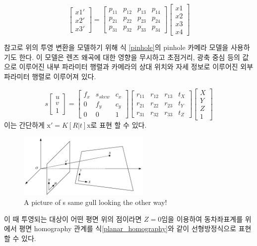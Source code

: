 \documentclass[master,korean,final]{cbnu-ecs}
\begin{document}
\begin{equation}
\begin{bmatrix} x1'\\x2'\\x3' \end{bmatrix} = \begin{bmatrix} p_{11} & p_{12} & p_{13} & p_{14} \\ p_{21} & p_{22} & p_{23} & p_{24}\\ p_{31} & p_{32} & p_{33} & p_{34} \end{bmatrix}\begin{bmatrix} x1\\x2\\x3\\x4 \end{bmatrix} \label{homography}
\end{equation}

참고로 위의 투영 변환을 모델하기 위해 식 \eqref{pinhole}의 pinhole 카메라 모델을 사용하기도 한다. 이 모델은 렌즈 왜곡에 대한 영향을 무시하고 초점거리, 광축 중심 등의 값으로 이루어진 내부 파라미터 행렬과 카메라의 상대 위치와 자세 정보로 이루어진 외부 파라미터 행렬로 이루어져 있다.

\begin{equation}
s\begin{bmatrix} u\\v\\1 \end{bmatrix} = \begin{bmatrix} f_{x} & s_{skew} & c_{x} \\ 0 & f_{y} & c_{y} \\ 0 & 0 & 1 \end{bmatrix}\begin{bmatrix} r_{11} & r_{12} & r_{13} & t_{X} \\ r_{21} & r_{22} & r_{23} & t_{Y}\\ r_{31} & r_{32} & r_{33} & t_{Z} \end{bmatrix}\begin{bmatrix} X\\Y\\Z\\1 \end{bmatrix} \label{pinhole}
\end{equation}
이는 간단하게 $\mathrm{x}'=K[R|t]\mathrm{x}$로 표현 할 수 있다.
\begin{figure}[!ht]
  \centering
	\includegraphics[width=240px]{img/planar_homography_cropped.pdf}
  \caption{A picture of s same gull looking the other way!}
\label{planar_homography}
\end{figure}
이 때 투영되는 대상이 어떤 평면 위의 점이라면 $Z=0$임을 이용하여 동차좌표계를 위에서 평면 homography 관계를 식\eqref{planar_homography}와 같이 선형방정식으로 표현할 수 있다.
\end{document}
